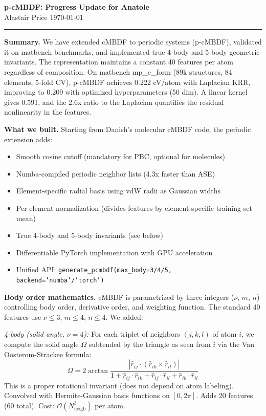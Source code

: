 \documentclass[11pt]{article}
\begin{document}
{\Large \textbf{p-cMBDF: Progress Update for Anatole}}\\[2pt]
{\normalsize Alastair Price \hfill \today}

\vspace{4pt}
\hrule
\vspace{8pt}

\textbf{Summary.} We have extended cMBDF to periodic systems (p-cMBDF), validated it on matbench benchmarks, and implemented true 4-body and 5-body geometric invariants. The representation maintains a constant 40 features per atom regardless of composition. On matbench mp\_e\_form (89k structures, 84 elements, 5-fold CV), p-cMBDF achieves 0.222 eV/atom with Laplacian KRR, improving to 0.209 with optimized hyperparameters (50 dim). A linear kernel gives 0.591, and the 2.6x ratio to the Laplacian quantifies the residual nonlinearity in the features.

\vspace{4pt}

\textbf{What we built.} Starting from Danish's molecular cMBDF code, the periodic extension adds:
\begin{itemize}[nosep]
    \item Smooth cosine cutoff (mandatory for PBC, optional for molecules)
    \item Numba-compiled periodic neighbor lists (4.3x faster than ASE)
    \item Element-specific radial basis using vdW radii as Gaussian widths
    \item Per-element normalization (divides features by element-specific training-set mean)
    \item True 4-body and 5-body invariants (see below)
    \item Differentiable PyTorch implementation with GPU acceleration
    \item Unified API: \texttt{generate\_pcmbdf(max\_body=3/4/5, backend='numba'/'torch')}
\end{itemize}

\vspace{4pt}

\textbf{Body order mathematics.} cMBDF is parametrized by three integers ($\nu$, $m$, $n$) controlling body order, derivative order, and weighting function. The standard 40 features use $\nu \leq 3$, $m \leq 4$, $n \leq 4$. We added:

\textit{4-body (solid angle, $\nu = 4$):} For each triplet of neighbors $(j,k,l)$ of atom $i$, we compute the solid angle $\Omega$ subtended by the triangle as seen from $i$ via the Van Oosterom-Strackee formula:
$$\Omega = 2\arctan\frac{|\hat{r}_{ij} \cdot (\hat{r}_{ik} \times \hat{r}_{il})|}{1 + \hat{r}_{ij}\cdot\hat{r}_{ik} + \hat{r}_{ij}\cdot\hat{r}_{il} + \hat{r}_{ik}\cdot\hat{r}_{il}}$$
This is a proper rotational invariant (does not depend on atom labeling). Convolved with Hermite-Gaussian basis functions on $[0, 2\pi]$. Adds 20 features (60 total). Cost: $\mathcal{O}(N_\text{neigh}^3)$ per atom.
\end{document}
